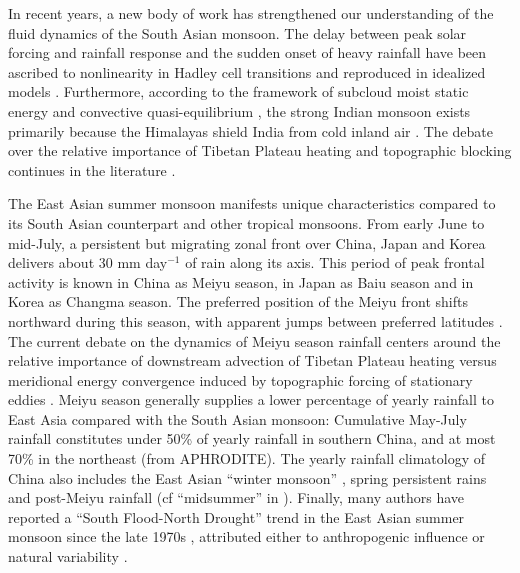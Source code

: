 	In recent years, a new body of work has strengthened our understanding of the fluid dynamics of the South Asian monsoon. The delay between peak solar forcing and rainfall response and the sudden onset of heavy rainfall have been ascribed to nonlinearity in Hadley cell transitions and reproduced in idealized models \citep{Plumb1992,Schneider2008,Bordoni2008}. Furthermore, according to the framework of subcloud moist static energy and convective quasi-equilibrium \citep{Emanuel1995,Prive2007,Prive2007a}, the strong Indian monsoon exists primarily because the Himalayas shield India from cold inland air \citep{Boos2010}. The debate over the relative importance of Tibetan Plateau heating and topographic blocking continues in the literature \citep{Wu2012,Boos2013,Qiu2013}.
	
	The East Asian summer monsoon manifests unique characteristics compared to its South Asian counterpart and other tropical monsoons. From early June to mid-July, a persistent but migrating zonal front over China, Japan and Korea delivers about 30 mm day$^{-1}$ of rain along its axis. This period of peak frontal activity is known in China as Meiyu season, in Japan as Baiu season and in Korea as Changma season. The preferred position of the Meiyu front shifts northward during this season, with apparent jumps between preferred latitudes \citep{Ding2005}. The current debate on the dynamics of Meiyu season rainfall centers around the relative importance of downstream advection of Tibetan Plateau heating \citep{Sampe2010} versus meridional energy convergence induced by topographic forcing of stationary eddies \citep{Molnar2010,Chen2014}. Meiyu season generally supplies a lower percentage of yearly rainfall to East Asia compared with the South Asian monsoon: Cumulative May-July rainfall constitutes under 50\% of yearly rainfall in southern China, and at most 70\% in the northeast (from APHRODITE). The yearly rainfall climatology of China also includes the East Asian ``winter monsoon'' \citep{Jhun2004}, spring persistent rains \citep{Tian1998} and post-Meiyu rainfall (cf ``midsummer'' in \cite{Kosaka2011}). Finally, many authors have reported a ``South Flood-North Drought'' trend in the East Asian summer monsoon since the late 1970s \citep{Gong2002,Ding2008}, attributed either to anthropogenic influence or natural variability \citep{Song2014,Lei2014}.
		
